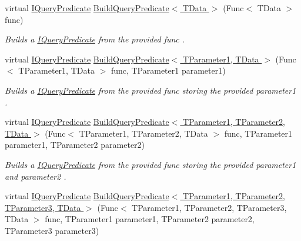 \begin{DoxyCompactItemize}
\item 
virtual \hyperlink{interfaceCqrs_1_1Repositories_1_1Queries_1_1IQueryPredicate}{I\+Query\+Predicate} \hyperlink{classCqrs_1_1Repositories_1_1Queries_1_1QueryStrategy_ad8d28df2576ea9669e4b02fd368ffab5_ad8d28df2576ea9669e4b02fd368ffab5}{Build\+Query\+Predicate$<$ T\+Data $>$} (Func$<$ T\+Data $>$ func)
\begin{DoxyCompactList}\small\item\em Builds a \hyperlink{interfaceCqrs_1_1Repositories_1_1Queries_1_1IQueryPredicate}{I\+Query\+Predicate} from the provided {\itshape func} . \end{DoxyCompactList}\item 
virtual \hyperlink{interfaceCqrs_1_1Repositories_1_1Queries_1_1IQueryPredicate}{I\+Query\+Predicate} \hyperlink{classCqrs_1_1Repositories_1_1Queries_1_1QueryStrategy_a00435830d1204507b1bf515263607be0_a00435830d1204507b1bf515263607be0}{Build\+Query\+Predicate$<$ T\+Parameter1, T\+Data $>$} (Func$<$ T\+Parameter1, T\+Data $>$ func, T\+Parameter1 parameter1)
\begin{DoxyCompactList}\small\item\em Builds a \hyperlink{interfaceCqrs_1_1Repositories_1_1Queries_1_1IQueryPredicate}{I\+Query\+Predicate} from the provided {\itshape func}  storing the provided {\itshape parameter1} . \end{DoxyCompactList}\item 
virtual \hyperlink{interfaceCqrs_1_1Repositories_1_1Queries_1_1IQueryPredicate}{I\+Query\+Predicate} \hyperlink{classCqrs_1_1Repositories_1_1Queries_1_1QueryStrategy_af8d1066419789fe942ebc167cd76ddfb_af8d1066419789fe942ebc167cd76ddfb}{Build\+Query\+Predicate$<$ T\+Parameter1, T\+Parameter2, T\+Data $>$} (Func$<$ T\+Parameter1, T\+Parameter2, T\+Data $>$ func, T\+Parameter1 parameter1, T\+Parameter2 parameter2)
\begin{DoxyCompactList}\small\item\em Builds a \hyperlink{interfaceCqrs_1_1Repositories_1_1Queries_1_1IQueryPredicate}{I\+Query\+Predicate} from the provided {\itshape func}  storing the provided {\itshape parameter1}  and {\itshape parameter2} . \end{DoxyCompactList}\item 
virtual \hyperlink{interfaceCqrs_1_1Repositories_1_1Queries_1_1IQueryPredicate}{I\+Query\+Predicate} \hyperlink{classCqrs_1_1Repositories_1_1Queries_1_1QueryStrategy_ad63fa502c1054b3663049cbbcd8754ea_ad63fa502c1054b3663049cbbcd8754ea}{Build\+Query\+Predicate$<$ T\+Parameter1, T\+Parameter2, T\+Parameter3, T\+Data $>$} (Func$<$ T\+Parameter1, T\+Parameter2, T\+Parameter3, T\+Data $>$ func, T\+Parameter1 parameter1, T\+Parameter2 parameter2, T\+Parameter3 parameter3)

\end{DoxyCompactItemize}
